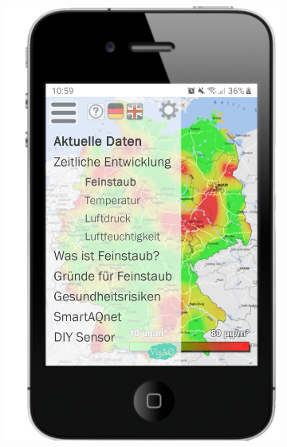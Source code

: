 \begin{figure}[H]
\begin{subfigure}[c]{0.5\textwidth}
        \includegraphics[scale=0.5]{media/Menue-Mobile-Version}
    \end{subfigure}
\end{figure}

